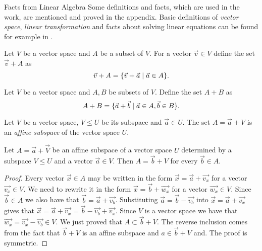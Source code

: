 \begin{chapter}{Facts from Linear Algebra}
Some definitions and facts, which are used in the work, are mentioned and proved in the appendix. Basic definitions of \emph{vector space}, \emph{linear transformation} and facts about solving linear equations can be found for example in \cite{meyer01}.

\label{appendix-linear-algebra}
\begin{definition}
Let $V$ be a vector space and $A$ be a subset of $V$. For a vector $\vec{v} \in V$ define the set $\vec{v} + A$ as
\[ \vec{v} + A = \{ \vec{v} + \vec{a} \mid \vec{a} \in A \} \text{.} \] 
\end{definition}

\begin{definition}
Let $V$ be a vector space and $A, B$ be subsets of $V$. Define the set $A + B$ as
\[ A + B = \{ \vec{a} + \vec{b} \mid \vec{a} \in A, \vec{b} \in B \} \text{.} \] 
\end{definition}

\begin{definition}
\label{definition-affine-subspace}
Let $V$ be a vector space, $V \leq U$ be its subspace and $\vec{a} \in U$. The set $A = \vec{a} + V$ is an \emph{affine subspace} of the vector space $U$.
\end{definition}

\begin{lemma}
\label{lemma-affine-subspace-equality}
Let $A = \vec{a} + \vec{V}$ be an affine subspace of a vector space $U$ determined by a subspace $V \leq U$ and a vector $\vec{a} \in V$. Then $A = \vec{b} + V$ for every $\vec{b} \in A$.
\end{lemma}
\begin{proof}
Every vector $\vec{x} \in A$ may be written in the form $\vec{x} = \vec{a} + \vec{v_x}$ for a vector $\vec{v_x} \in V$. We need to rewrite it in the form $\vec{x} = \vec{b} + \vec{w_x}$ for a vector $\vec{w_x} \in V$. Since $\vec{b} \in A$ we also have that $\vec{b} = \vec{a} + \vec{v_b}$. Substituting $\vec{a} = \vec{b} - \vec{v_b}$ into $\vec{x} = \vec{a} + \vec{v_x}$ gives that $\vec{x} = \vec{a} + \vec{v_x} = \vec{b} - \vec{v_b} + \vec{v_x}$. Since $V$ is a vector space we have that $\vec{w_x} = \vec{v_x} - \vec{v_b} \in V$. We just proved that $A \subset \vec{b} + V$. The reverse inclusion comes from the fact that $\vec{b} + V$ is an affine subspace and $a \in \vec{b} + V$ and. The proof is symmetric.
\end{proof}


\end{chapter}
